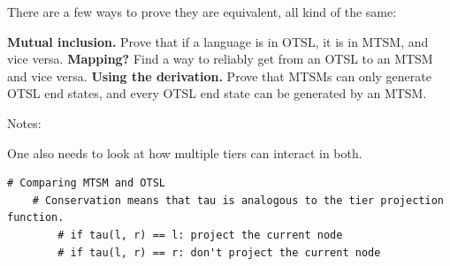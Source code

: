 
There are a few ways to prove they are equivalent, all kind of the same:

\pex \a \textbf{Mutual inclusion.} Prove that if a language is in OTSL, it is in MTSM, and vice versa.
    \a \textbf{Mapping?} Find a way to reliably get from an OTSL to an MTSM and vice versa.
    \a \textbf{Using the derivation.} Prove that MTSMs can only generate OTSL end states, and every OTSL end state can be generated by an MTSM.
\xe

Notes:

\pex \a One also needs to look at how multiple tiers can interact in both.
\xe

\begin{verbatim}
# Comparing MTSM and OTSL
    # Conservation means that tau is analogous to the tier projection function. 
        # if tau(l, r) == l: project the current node
        # if tau(l, r) == r: don't project the current node
\end{verbatim}
